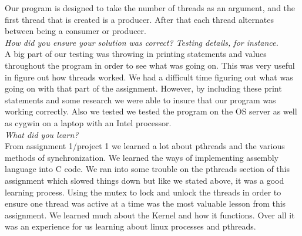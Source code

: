 \documentclass[letterpaper,10pt,titlepage]{article}
\begin{document}
Our program is designed to take the number of threads as an argument, and the first thread that is created is a producer. After that each thread alternates between being a consumer or producer.  \\

\textit{How did you ensure your solution was correct? Testing details, for instance.}\\

A big part of our testing was throwing in printing statements and values throughout the program in order to see what was going on. This was very useful in figure out how threads worked. We had a difficult time figuring out what was going on with that part of the assignment. However, by including these print statements and some research we were able to insure that our program was working correctly. Also we tested we tested the program on the OS server as well as cygwin on a laptop with an Intel processor.\\

\textit{What did you learn?}\\

From assignment 1/project 1 we learned a lot about pthreads and the various methods of synchronization. We learned the ways of implementing assembly language into C code. We ran into some trouble on the pthreads section of this assignment which slowed things down but like we stated above, it was a good learning process. Using the mutex to lock and unlock the threads in order to ensure one thread was active at a time was the most valuable lesson from this assignment. We learned much about the Kernel and how it functions. Over all it was  an experience for us learning about linux processes and pthreads.\\
\end{document}
